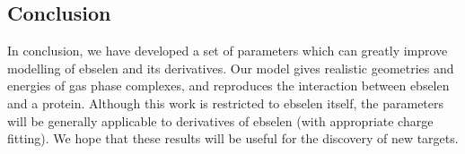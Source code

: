 \begin{refsection}
\section{Conclusion}
In conclusion, we have developed a set of parameters which can greatly improve modelling of ebselen and its derivatives.
Our model gives realistic geometries and energies of gas phase complexes, and reproduces the interaction between ebselen and a protein.
Although this work is restricted to ebselen itself, the parameters will be generally applicable to derivatives of ebselen (with appropriate charge fitting).
We hope that these results will be useful for the discovery of new targets.

\printbibliography[heading=subbibliography]
\end{refsection}
